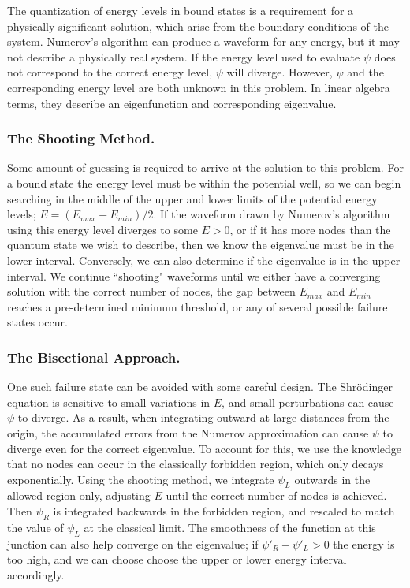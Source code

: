 \documentclass[aps,prl,twocolumn,superscriptaddress]{revtex4-1}
\begin{document}
The quantization of energy levels in bound states is a requirement for a physically significant solution, which arise from the 
boundary conditions of the system. Numerov's algorithm can produce a waveform for any energy, but it may not describe a 
physically real system. If the energy level used to evaluate $\psi$ does not correspond to the correct energy level, $\psi$ will 
diverge. However, $\psi$ and the corresponding energy level are both unknown in this problem. In linear algebra terms, they 
describe an eigenfunction and corresponding eigenvalue.

\subsubsection{The Shooting Method.}

Some amount of guessing is required to arrive at the solution to this problem. For a bound state the energy level must be within 
the potential well, so we can begin searching in the middle of the upper and lower limits of the potential energy 
levels; $E = (E_{max}-E_{min})/2$. If the waveform drawn by Numerov's algorithm using this energy level diverges to 
some $E>0$, or if it has more nodes than the quantum state we wish to describe, then we know the eigenvalue must be in the 
lower interval. Conversely, we can also determine if the eigenvalue is in the upper interval. We continue ``shooting" waveforms 
until we either have a converging solution with the correct number of nodes, the gap between $E_{max}$ and $E_{min}$ reaches a 
pre-determined minimum threshold, or any of several possible failure states occur. 

\subsubsection{The Bisectional Approach.}

One such failure state can be avoided with some careful design. The Shr\"{o}dinger equation is sensitive to small variations 
in $E$, and small perturbations can cause $\psi$ to diverge. As a result, when integrating outward at large distances from the 
origin, the accumulated errors from the Numerov approximation can cause $\psi$ to diverge even for the correct eigenvalue. To 
account for this, we use the knowledge that no nodes can occur in the classically forbidden region, which only decays 
exponentially. Using the shooting method, we integrate $\psi_L$ outwards in the allowed region only, adjusting $E$ until the 
correct number of nodes is achieved. Then $\psi_R$ is integrated backwards in the forbidden region, and rescaled to match the 
value of $\psi_L$ at the classical limit. The smoothness of the function at this junction can also help converge on the 
eigenvalue; if $\psi'_R-\psi'_L>0$ the energy is too high, and we can choose choose the upper or lower energy interval accordingly. 
\end{document}
